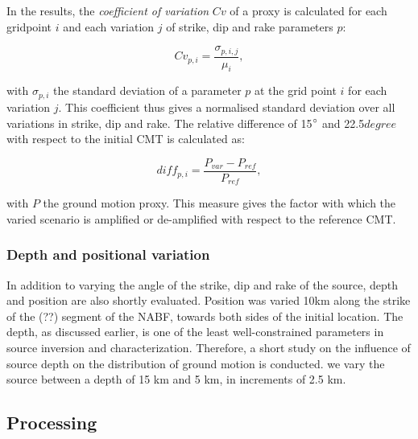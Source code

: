 \documentclass[../Text/00main.tex]{subfiles}
\begin{document}
In the results, the \textit{coefficient of variation} $Cv$ of a proxy is calculated for each gridpoint $i$ and each variation $j$ of strike, dip and rake parameters $p$:

\begin{equation}
Cv_{p, i} = \frac{\sigma_{p, i, j}}{\mu_{i}},
\end{equation}

with $\sigma_{p,i}$ the standard deviation of a parameter $p$ at the grid point $i$ for each variation $j$. This coefficient thus gives a normalised standard deviation over all variations in strike, dip and rake. The relative difference of 15$\degree$ and 22.5$degree$ with respect to the initial CMT is calculated as:

\begin{equation}
    diff_{p,i} = \frac{P_{var} - P_{ref}}{P_{ref}},
\end{equation}

with $P$ the ground motion proxy. This measure gives the factor with which the varied scenario is amplified or de-amplified with respect to the reference CMT.

\subsubsection{Depth and positional variation}

In addition to varying the angle of the strike, dip and rake of the source, depth and position are also shortly evaluated. Position was varied 10km along the strike of the (??) segment of the NABF, towards both sides of the initial location. The depth, as discussed earlier, is one of the least well-constrained parameters in source inversion and characterization. Therefore, a short study on the influence of source depth on the distribution of ground motion is conducted. we vary the source between a depth of 15 km and 5 km, in increments of 2.5 km. 

\subsection{Processing}
\end{document}
